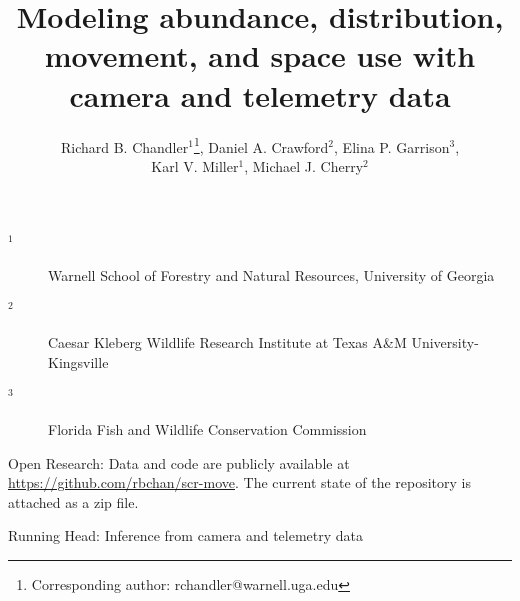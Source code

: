 \documentclass[12pt]{article}
\begin{document}
\title{Modeling abundance, distribution, movement, and space
  use with camera and telemetry data}
\author{Richard B. Chandler$^1$\footnote{Corresponding author: rchandler@warnell.uga.edu}, Daniel A. Crawford$^2$, Elina P. Garrison$^3$, \\
  Karl V. Miller$^1$, Michael J. Cherry$^2$}

\maketitle

\vspace{12pt}

\begin{description}%
\item[$^1$] Warnell School of Forestry and Natural Resources, University of Georgia %
\item[$^2$] Caesar Kleberg Wildlife Research Institute at Texas A\&M University-Kingsville %
\item[$^3$] Florida Fish and Wildlife Conservation Commission %
\end{description}


\vspace{24pt}

Open Research: Data and code are publicly available at
\url{https://github.com/rbchan/scr-move}. The current state of the
repository is attached as a zip file.  

Running Head: Inference from camera and telemetry data


\clearpage


\linenumbers
\doublespacing
\end{document}
